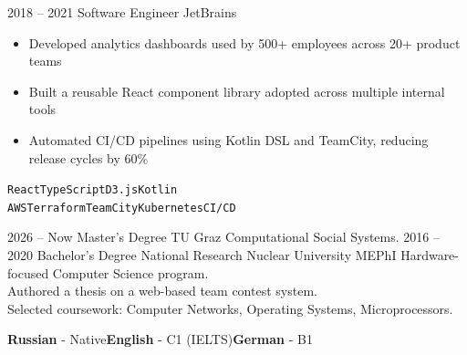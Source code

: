 \documentclass[2pt]{template}
\begin{document}
\begin{entrylist}
    \entry
    {2018 -- 2021}
    {Software Engineer}
    {JetBrains}
    {
        \begin{itemize}[noitemsep,topsep=5pt,leftmargin=8pt]
            \item Developed analytics dashboards used by 500+ employees across 20+ product teams
            \item Built a reusable React component library adopted across multiple internal tools
            \item Automated CI/CD pipelines using Kotlin DSL and TeamCity, reducing release cycles by 60\%
        \end{itemize}
        \texttt{React}\slashsep\texttt{TypeScript}\slashsep\texttt{D3.js}\slashsep\texttt{Kotlin}\\
        {\color{gray}\texttt{AWS}\slashsep\texttt{Terraform}\slashsep\texttt{TeamCity}\slashsep\texttt{Kubernetes}\slashsep\texttt{CI/CD}}}

\end{entrylist}



\begin{entrylist}
    \entry
    {2026 -- Now}
	{Master's Degree}
	{TU Graz}
	{Computational Social Systems.}
	\entry
	{2016 -- 2020}
	{Bachelor's Degree}
	{National Research Nuclear University MEPhI}
    {Hardware-focused Computer Science program.\\
    Authored a thesis on a web-based team contest system.\\
    Selected coursework: Computer Networks, Operating Systems, Microprocessors.}
\end{entrylist}


\begin{minipage}[t]{0.6\textwidth}
	\vspace{-\baselineskip}


    \textbf{Russian} - Native\slashsep\textbf{English} - C1 (IELTS)\slashsep\textbf{German} - B1
\end{minipage}


\end{document}

